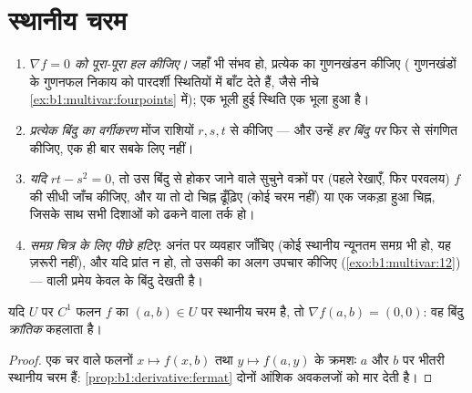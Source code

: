 \section{स्थानीय चरम}

\begin{method}
\label{met:b1:multivar:extremamethod}
\begin{enumerate}
  \item \emph{$\nabla f = 0$ को पूरा-पूरा हल कीजिए।} जहाँ भी संभव हो,
        प्रत्येक  का गुणनखंडन कीजिए ( गुणनखंडों के
        गुणनफल निकाय को पारदर्शी स्थितियों में बाँट देते हैं, जैसे नीचे
        \cref{ex:b1:multivar:fourpoints} में); एक भूली हुई स्थिति एक भूला
        हुआ  है।
  \item \emph{प्रत्येक बिंदु का वर्गीकरण} मोंज राशियों $r, s, t$ से
        कीजिए --- और उन्हें \emph{हर बिंदु पर} फिर से संगणित कीजिए, एक
        ही बार सबके लिए नहीं।
  \item \emph{यदि $rt - s^2 = 0$}, तो उस बिंदु से होकर जाने वाले
        सुचुने वक्रों पर (पहले रेखाएँ, फिर परवलय) $f$ की सीधी जाँच
        कीजिए, और या तो दो चिह्न ढूँढ़िए (कोई चरम नहीं) या एक जकड़ा हुआ
        चिह्न, जिसके साथ सभी दिशाओं को ढकने वाला तर्क हो।
  \item \emph{समग्र चित्र के लिए पीछे हटिए}: अनंत पर व्यवहार जाँचिए (कोई
        स्थानीय न्यूनतम समग्र भी हो, यह ज़रूरी नहीं), और यदि प्रांत
         न हो, तो उसकी  का अलग उपचार कीजिए
        (\cref{exo:b1:multivar:12}) ---  वाली प्रमेय केवल
         के बिंदु देखती है।
\end{enumerate}
\end{method}

\begin{theorem}[क्रांतिक बिंदु]\label{thm:b1:multivar:critical}
यदि  $U$ पर $C^1$ फलन $f$ का $(a,b) \in U$ पर स्थानीय चरम है,
तो $\nabla f(a,b) = (0,0)$: वह बिंदु \emph{क्रांतिक}
कहलाता है।
\end{theorem}

\begin{proof}
एक चर वाले फलनों $x \mapsto f(x, b)$ तथा $y \mapsto f(a, y)$ के क्रमशः $a$
और $b$ पर भीतरी स्थानीय चरम हैं: \cref{prop:b1:derivative:fermat} दोनों
आंशिक अवकलजों को मार देती है।
\end{proof}

